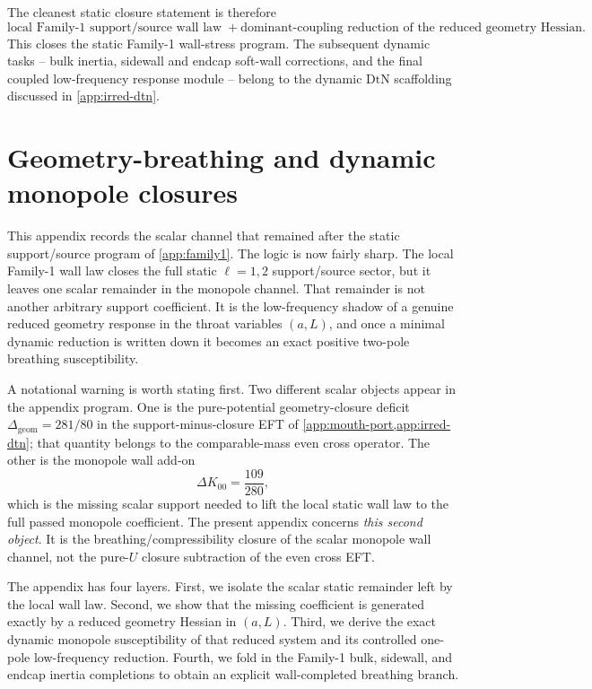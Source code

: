 \documentclass[11pt]{article}
\newcommand{\DtN}{\mathrm{DtN}}
\begin{document}
The cleanest static closure statement is therefore
\begin{equation}
\boxed{
\text{local Family-1 support/source wall law}
\;+
\text{dominant-coupling reduction of the reduced geometry Hessian}.
}
\label{eq:family1-final-static-closure}
\end{equation}
This closes the static Family-1 wall-stress program.  The subsequent dynamic tasks -- bulk
inertia, sidewall and endcap soft-wall corrections, and the final coupled low-frequency
response module -- belong to the dynamic \(\DtN\) scaffolding discussed in
\cref{app:irred-dtn}.

\section{Geometry-breathing and dynamic monopole closures}
\label{app:geom-breathing}

This appendix records the scalar channel that remained after the static support/source
program of \cref{app:family1}.  The logic is now fairly sharp.
The local Family-1 wall law closes the full static \(\ell=1,2\) support/source sector,
but it leaves one scalar remainder in the monopole channel.
That remainder is not another arbitrary support coefficient.
It is the low-frequency shadow of a genuine reduced geometry response in the throat
variables \((a,L)\), and once a minimal dynamic reduction is written down it becomes an
exact positive two-pole breathing susceptibility.

A notational warning is worth stating first.
Two different scalar objects appear in the appendix program.
One is the pure-potential geometry-closure deficit
\(\Delta_{\mathrm{geom}}=281/80\) in the support-minus-closure EFT of
\cref{app:mouth-port,app:irred-dtn}; that quantity belongs to the
comparable-mass even cross operator.
The other is the monopole wall add-on
\begin{equation}
\Delta K_{00}=\frac{109}{280},
\label{eq:geom-breathing-deltaK00}
\end{equation}
which is the missing scalar support needed to lift the local static wall law to the full
passed monopole coefficient.
The present appendix concerns \emph{this second object}.
It is the breathing/compressibility closure of the scalar monopole wall channel,
not the pure-\(U\) closure subtraction of the even cross EFT.

The appendix has four layers.
First, we isolate the scalar static remainder left by the local wall law.
Second, we show that the missing coefficient is generated exactly by a reduced geometry
Hessian in \((a,L)\).
Third, we derive the exact dynamic monopole susceptibility of that reduced system and its
controlled one-pole low-frequency reduction.
Fourth, we fold in the Family-1 bulk, sidewall, and endcap inertia completions to obtain
an explicit wall-completed breathing branch.
\end{document}
